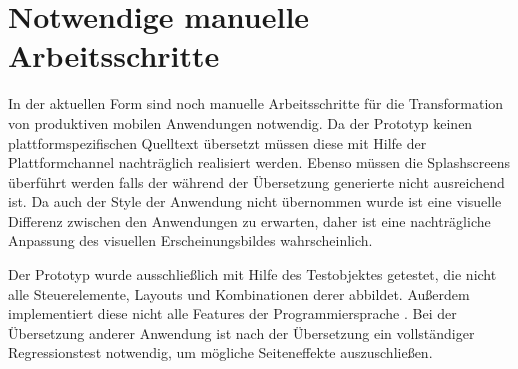 \section{Notwendige manuelle Arbeitsschritte}

In der aktuellen Form sind noch manuelle Arbeitsschritte für die Transformation von produktiven mobilen Anwendungen notwendig.  Da der Prototyp keinen plattformspezifischen Quelltext übersetzt müssen diese mit Hilfe der Plattformchannel nachträglich realisiert werden.  Ebenso müssen die Splashscreens überführt werden falls der während der Übersetzung generierte nicht ausreichend ist.  Da auch der Style der Anwendung nicht übernommen wurde ist eine visuelle Differenz zwischen den Anwendungen zu erwarten, daher ist eine nachträgliche Anpassung des visuellen Erscheinungsbildes wahrscheinlich. 

Der Prototyp wurde ausschließlich mit Hilfe des Testobjektes getestet,  die nicht alle Steuerelemente,  Layouts und Kombinationen derer abbildet.  Außerdem implementiert diese nicht alle Features der Programmiersprache \Csharp{}.  Bei der Übersetzung anderer Anwendung ist nach der Übersetzung ein vollständiger Regressionstest notwendig, um mögliche Seiteneffekte auszuschließen. 